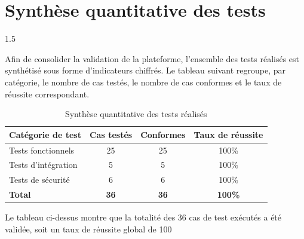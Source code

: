 \documentclass[a4paper,12pt]{report}
\begin{document}
\section{Synthèse quantitative des tests}
\vspace{0.5cm}
\begin{spacing}{1.5}
\justifying

Afin de consolider la validation de la plateforme, l'ensemble des tests réalisés est synthétisé sous forme d'indicateurs chiffrés. Le tableau suivant regroupe, par catégorie, le nombre de cas testés, le nombre de cas conformes et le taux de réussite correspondant.


\begin{table}[h]
    \centering
    \begin{tabular}{|l|c|c|c|}
    \hline
    \textbf{Catégorie de test} & \textbf{Cas testés} & \textbf{Conformes} & \textbf{Taux de réussite} \\ \hline
    Tests fonctionnels   & 25 & 25 & 100\% \\ \hline
    Tests d'intégration  & 5  & 5  & 100\% \\ \hline
    Tests de sécurité    & 6  & 6  & 100\% \\ \hline
    \textbf{Total}       & \textbf{36} & \textbf{36} & \textbf{100\%} \\ \hline
    \end{tabular}
    \caption{Synthèse quantitative des tests réalisés}
    \end{table}

    Le tableau ci-dessus montre que la totalité des 36 cas de test exécutés a été validée, soit un taux de réussite global de 100 %


\end{spacing}
\end{document}
